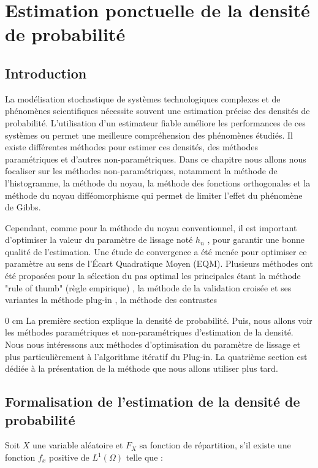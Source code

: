 \chapter{Estimation ponctuelle de la densité de probabilité}
\section{Introduction}
La modélisation stochastique de systèmes technologiques complexes et de phénomènes scientifiques nécessite souvent une estimation précise des densités de probabilité. L'utilisation d'un estimateur fiable améliore les performances de ces systèmes ou permet une meilleure compréhension des phénomènes étudiés. Il existe différentes méthodes pour estimer ces densités, des méthodes paramétriques et d’autres non-paramétriques. Dans ce chapitre nous allons nous focaliser sur les méthodes non-paramétriques, notamment la méthode de l’histogramme, la méthode du noyau, la méthode des fonctions orthogonales  et la méthode du noyau difféomorphisme  qui permet de limiter l'effet du phénomène de Gibbs. 

\setlength{\parindent}{0 cm}
Cependant, comme pour la méthode du noyau conventionnel, il est important d’optimiser la valeur du paramètre de lissage noté  $h_n$ , pour garantir une bonne qualité de l’estimation. Une étude de convergence a été menée pour optimiser ce paramètre au sens de l’Écart Quadratique Moyen 
(EQM). Plusieurs méthodes ont été proposées pour la sélection du pas optimal les principales étant la méthode "rule of thumb" (règle empirique) , la méthode de la validation croisée et ses variantes  la méthode plug-in , la méthode des contrastes

\setlength{\parindent} {0 cm}
La première section explique la densité de probabilité. Puis, nous allons voir les méthodes paramétriques et non-paramétriques d’estimation de la densité.  Nous nous intéressons aux méthodes d’optimisation du paramètre de lissage et plus particulièrement à l’algorithme itératif du Plug-in. La quatrième section est dédiée à la présentation de la méthode que nous allons utiliser plus tard. 
\section{Formalisation de l'estimation de la densité de probabilité }
Soit  $X$  une variable aléatoire et  $F_X$ sa fonction de répartition, s’il existe une fonction $f_x$ positive de $L^{1}$$(\Omega)$ telle que : 


